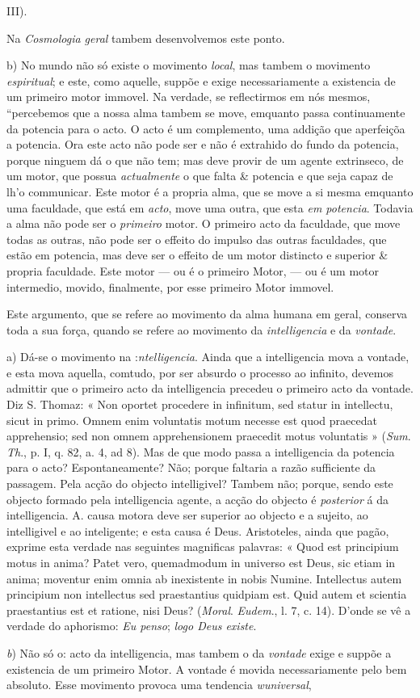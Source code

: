 III).\par Na \emph{Cosmologia geral} tambem desenvolvemos este ponto.\par b) No mundo não só existe o movimento \emph{local}, mas tambem o movimento \emph{espiritual}; e este, como aquelle, suppõe e exige necessariamente a existencia de um primeiro motor immovel. Na verdade, se reflectirmos em nós mesmos, “percebemos que a nossa alma tambem se move, emquanto passa continuamente da potencia para o acto. O acto é um complemento, uma addição que aperfeiçõa a potencia. Ora este acto não pode ser e não é extrahido do fundo da potencia, porque ninguem dá o que não tem; mas deve provir de um agente extrinseco, de um motor, que possua \emph{actualmente} o que falta \& potencia e que seja capaz de lh'o communicar. Este motor é a propria alma, que se move a si mesma emquanto uma faculdade, que está em \emph{acto}, move uma outra, que esta \emph{em potencia}. Todavia a alma não pode ser o \emph{primeiro} motor. O primeiro acto da faculdade, que move todas as outras, não pode ser o effeito do impulso das outras faculdades, que estão em potencia, mas deve ser o effeito de um motor distincto e superior \& propria faculdade. Este motor --- ou é o primeiro Motor, --- ou é um motor intermedio, movido, finalmente, por esse primeiro Motor immovel.\par Este argumento, que se refere ao movimento da alma humana em geral, conserva toda a sua força, quando se refere ao movimento da \emph{intelligencia} e da \emph{vontade}.\par a) Dá-se o movimento na :\emph{ntelligencia}. Ainda que a intelligencia mova a vontade, e esta mova aquella, comtudo, por ser absurdo o processo ao infinito, devemos admittir que o primeiro acto da intelligencia precedeu o primeiro acto da vontade. Diz S. Thomaz: « Non oportet procedere in infinitum, sed statur in intellectu, sicut in primo. Omnem enim voluntatis motum necesse est quod praecedat apprehensio; sed non omnem apprehensionem praecedit motus voluntatis » (\emph{Sum}. \emph{Th}., p. I, q. 82, a. 4, ad 8). Mas de que modo passa a intelligencia da potencia para o acto? Espontaneamente? Não; porque faltaria a razão sufficiente da passagem. Pela acção do objecto intelligivel? Tambem não; porque, sendo este objecto formado pela intelligencia agente, a acção do objecto é \emph{posterior} á da intelligencia. A. causa motora deve ser superior ao objecto e a sujeito, ao intelligivel e ao inteligente; e esta causa é Deus. Aristoteles, ainda que pagão, exprime esta verdade nas seguintes magnificas palavras: « Quod est principium motus in anima? Patet vero, quemadmodum in universo est Deus, sic etiam in anima; moventur enim omnia ab inexistente in nobis Numine. Intellectus autem principium non intellectus sed praestantius quidpiam est. Quid autem et scientia praestantius est et ratione, nisi Deus? (\emph{Moral}. \emph{Eudem}., l. 7, c. 14). D'onde se vê a verdade do aphorismo: \emph{Eu penso}; \emph{logo Deus existe}.\par \emph{b}) Não só o: acto da intelligencia, mas tambem o da \emph{vontade} exige e suppõe a existencia de um primeiro Motor. A vontade é movida necessariamente pelo bem absoluto. Esse movimento provoca uma tendencia \emph{wuniversal}, 